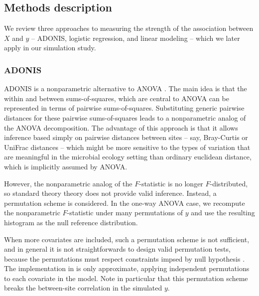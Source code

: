 \documentclass{article}
\begin{document}
\subsection{Methods description}
\label{subsec:methods_description}

We review three approaches to measuring the strength of the association between
$X$ and $y$ -- ADONIS, logistic regression, and linear modeling -- which we
later apply in our simulation study.

\subsubsection{ADONIS}
\label{subsubsec:adonis}

ADONIS is a nonparametric alternative to ANOVA \citep{anderson2001new}. The main
idea is that the within and between sums-of-squares, which are central to ANOVA
can be represented in terms of pairwise sums-of-squares. Substituting generic
pairwise distances for these pairwise sums-of-squares leads to a nonparametric
analog of the ANOVA decomposition. The advantage of this approach is that it
allows inference based simply on pairwise distances between sites -- say,
Bray-Curtis or UniFrac distances -- which might be more sensitive to the types
of variation that are meaningful in the microbial ecology setting than ordinary
euclidean distance, which is implicitly assumed by ANOVA.

However, the nonparametric analog of the $F$-statistic is no longer
$F$-distributed, so standard theory theory does not provide valid inference.
Instead, a permutation scheme is considered. In the one-way ANOVA case, we
recompute the nonparametric $F$-statistic under many permutations of $y$ and use
the resulting histogram as the null reference distribution.

When more covariates are included, such a permutation scheme is not sufficient,
and in general it is not straightforwards to design valid permutation tests,
because the permutations must respect constraints impsed by null hypothesis
\cite{anderson2001new}. The implementation in \citep{oksanen2007vegan} is only
approximate, applying independent permutations to each covariate in the model.
Note in particular that this permutation scheme breaks the between-site
correlation in the simulated $y$.

\end{document}
